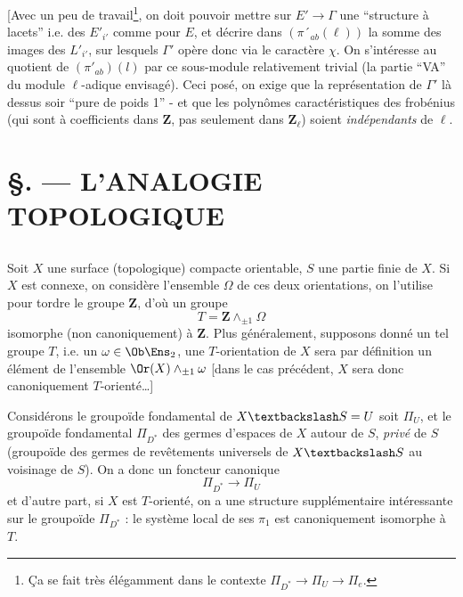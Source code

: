  [Avec un peu de travail\footnote{\c{C}a se fait très élégamment dans le contexte $\Pi_{D^*} \to \Pi_{U} \to \Pi_{e}$.}, on doit pouvoir mettre sur $E' \to \Gamma$ une ``structure à lacets'' i.e. des $E'_{i'}$ comme pour $E$, et décrire dans $(\pi´_{ab}(\ell))$ la somme des images des $L'_{i'}$, sur lesquels $\Gamma'$ opère donc via le caractère $\chi$. On s'intéresse au quotient de $(\pi'_{ab})(l)$ par ce sous-module relativement trivial (la partie ``VA'' du module $\ell$-adique envisagé). Ceci posé, on exige que la représentation de $\Gamma'$ là dessus soir ``pure de poids 1'' - et que les polynômes caractéristiques des frobénius (qui sont à coefficients dans $\mathbf{Z}$, pas seulement dans $\mathbf{Z}_{\ell}$) soient \emph{indépendants} de $\ell$.












\chapter*{\S {}. --- L'ANALOGIE TOPOLOGIQUE}\thispagestyle{empty}
\label{sec:12}
\section*{}

Soit $X$ une surface (topologique) compacte orientable, $S$ une partie finie de $X$. Si $X$ est connexe, on considère l'ensemble $\Omega$ de ces deux orientations, on l'utilise pour tordre le groupe $\mathbf{Z}$, d'où un groupe
$$
T = \mathbf{Z} \wedge_{\pm 1} \Omega
$$
isomorphe (non canoniquement) à $\mathbf{Z}$. Plus généralement, supposons donné un tel groupe $T$, i.e. un $\omega \in \Ob \Ens_2$, une $T$-orientation de $X$ sera par définition un élément de l'ensemble $\Or (X) \wedge_{\pm 1} \omega$ [dans le cas précédent, $X$ sera donc canoniquement $T$-orienté\dots]

Considérons le groupoïde fondamental de $X \textbackslash S = U$ soit $\Pi_U$, et le groupoïde fondamental $\Pi_{D^*}$ des germes d'espaces de $X$ autour de $S$, \emph{privé} de $S$ (groupoïde des germes de revêtements universels de $X \textbackslash S$ au voisinage de $S$). On a donc un foncteur canonique
$$
\Pi_{D^*} \to \Pi_U
$$
et d'autre part, si $X$ est $T$-orienté, on a une structure supplémentaire intéressante sur le groupoïde $\Pi_{D^*}$ : le système local de ses $\pi_1$ est canoniquement isomorphe à $T$.

